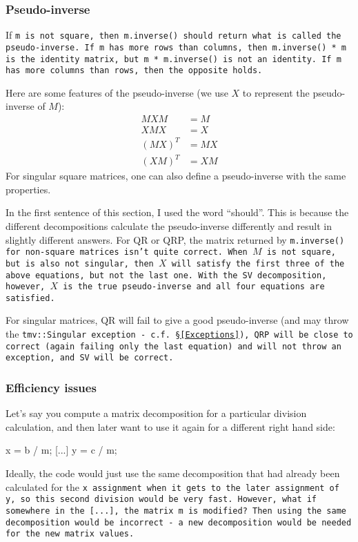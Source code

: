 \subsubsection{Pseudo-inverse}
\label{Matrix_Division_Pseudoinverse}

If \tt{m} is not square, then \tt{m.inverse()} should return what is called the pseudo-inverse.
If \tt{m} has more rows than columns, then \tt{m.inverse() * m} is the identity matrix, 
but \tt{m * m.inverse()}
is not an identity.  If \tt{m} has more columns than rows, then the opposite holds.

Here are some features of the pseudo-inverse (we use $X$ to represent the pseudo-inverse
of $M$):
\begin{align*}
M X M &= M \\
X M X &= X \\
(M X)^T &= M X \\
(X M)^T &= X M 
\end{align*}
For singular square matrices, 
one can also define a pseudo-inverse with the same properties.

In the first sentence of this section, I used the word ``should''.  
This is because the different decompositions calculate the pseudo-inverse 
differently and result in slightly
different answers.  For QR or QRP, the matrix returned by \tt{m.inverse()} for
non-square matrices isn't
quite correct.  When $M$ is not square, but is also not singular, then $X$
will satisfy the first three of the above equations,
but not the last one.  With the SV decomposition, however,
$X$ is the true pseudo-inverse and all four equations are satisfied.

For singular matrices, QR will fail to give a good pseudo-inverse (and may throw the
\tt{tmv::Singular} exception - c.f. \S\ref{Exceptions}), QRP will be close to correct
(again failing only the last equation) and will not throw an exception, and SV will be correct.

\subsubsection{Efficiency issues}
\label{Matrix_Division_Efficiency}

Let's say you compute a matrix decomposition for a particular division calculation, and
then later want to use it again for a different right hand side:
\begin{tmvcode}
x = b / m;
[...]
y = c / m;
\end{tmvcode}
Ideally, the code would just use the same decomposition that had already been calculated
for the \tt{x} assignment when it gets to the later assignment of \tt{y}, 
so this second division would be very fast.
However, what if somewhere in the \tt{[...]}, the matrix \tt{m} is modified?  
Then using
the same decomposition would be incorrect - a new decomposition would be needed
for the new matrix values.

